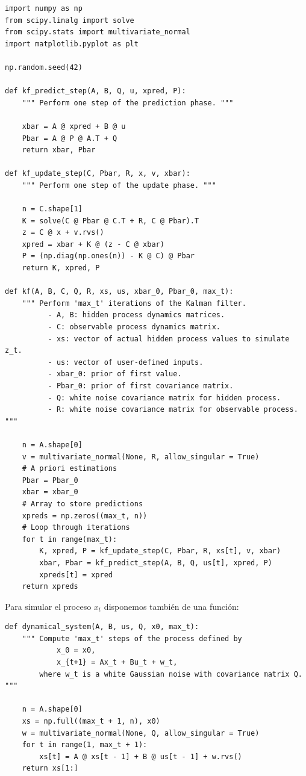 \documentclass[11pt,a4paper]{article}
\begin{document}
\begin{verbatim}
import numpy as np
from scipy.linalg import solve
from scipy.stats import multivariate_normal
import matplotlib.pyplot as plt

np.random.seed(42)

def kf_predict_step(A, B, Q, u, xpred, P):
    """ Perform one step of the prediction phase. """

    xbar = A @ xpred + B @ u
    Pbar = A @ P @ A.T + Q
    return xbar, Pbar

def kf_update_step(C, Pbar, R, x, v, xbar):
    """ Perform one step of the update phase. """

    n = C.shape[1]
    K = solve(C @ Pbar @ C.T + R, C @ Pbar).T
    z = C @ x + v.rvs()
    xpred = xbar + K @ (z - C @ xbar)
    P = (np.diag(np.ones(n)) - K @ C) @ Pbar
    return K, xpred, P

def kf(A, B, C, Q, R, xs, us, xbar_0, Pbar_0, max_t):
    """ Perform 'max_t' iterations of the Kalman filter.
          - A, B: hidden process dynamics matrices.
          - C: observable process dynamics matrix.
          - xs: vector of actual hidden process values to simulate z_t.
          - us: vector of user-defined inputs.
          - xbar_0: prior of first value.
          - Pbar_0: prior of first covariance matrix.
          - Q: white noise covariance matrix for hidden process.
          - R: white noise covariance matrix for observable process. """

    n = A.shape[0]
    v = multivariate_normal(None, R, allow_singular = True)
    # A priori estimations
    Pbar = Pbar_0
    xbar = xbar_0
    # Array to store predictions
    xpreds = np.zeros((max_t, n))
    # Loop through iterations
    for t in range(max_t):
        K, xpred, P = kf_update_step(C, Pbar, R, xs[t], v, xbar)
        xbar, Pbar = kf_predict_step(A, B, Q, us[t], xpred, P)
        xpreds[t] = xpred
    return xpreds
\end{verbatim}

Para simular el proceso $x_t$ disponemos también de una función:

\begin{verbatim}
def dynamical_system(A, B, us, Q, x0, max_t):
    """ Compute 'max_t' steps of the process defined by
            x_0 = x0,
            x_{t+1} = Ax_t + Bu_t + w_t,
        where w_t is a white Gaussian noise with covariance matrix Q. """

    n = A.shape[0]
    xs = np.full((max_t + 1, n), x0)
    w = multivariate_normal(None, Q, allow_singular = True)
    for t in range(1, max_t + 1):
        xs[t] = A @ xs[t - 1] + B @ us[t - 1] + w.rvs()
    return xs[1:]
\end{verbatim}
\end{document}
